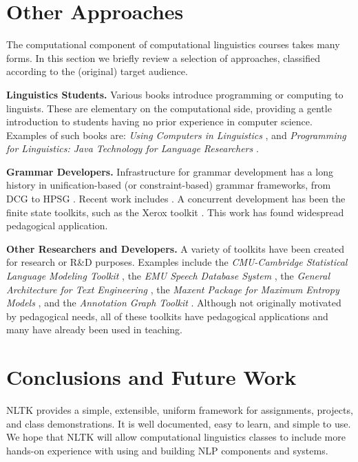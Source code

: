 \documentclass[11pt]{article}
\begin{document}
\section{Other Approaches}
\label{sec:approaches}

The computational component of computational linguistics courses takes
many forms.  In this section we briefly review a selection of approaches,
classified according to the (original) target audience.

{\bf Linguistics Students.}
Various books introduce programming or computing to linguists.
These are elementary on the computational side, providing a
gentle introduction to students having no prior experience
in computer science.  Examples of such books are:
\emph{Using Computers in Linguistics}
\cite{Lawler98}, and
\emph{Programming for Linguistics: Java Technology for Language
Researchers} \cite{Hammond02}.

{\bf Grammar Developers.}
Infrastructure for grammar development has a long history in
unification-based (or constraint-based) grammar frameworks, from DCG
\cite{PereiraWarren80} to HPSG \cite{PollardSag94}.  Recent work includes
\cite{Copestake00,Baldridge02}.  A concurrent development has been the
finite state toolkits, such as the Xerox toolkit \cite{Beesley02}.  This
work has found widespread pedagogical application.

{\bf Other Researchers and Developers.}
A variety of toolkits have been created for research or R\&D
purposes.  Examples include
the \emph{CMU-Cambridge Statistical Language Modeling Toolkit}
\cite{Clarkson97},
the \emph{EMU Speech Database System} \cite{Harrington99},
the \emph{General Architecture for Text Engineering} \cite{Bontcheva02},
the \emph{Maxent Package for Maximum Entropy Models} \cite{maxent},
and the \emph{Annotation Graph Toolkit} \cite{MaedaBird02}.
Although not originally motivated by pedagogical needs, all of these
toolkits have pedagogical applications and many have already been
used in teaching.

\section{Conclusions and Future Work}
\label{sec:conclusion}

NLTK provides a simple, extensible, uniform framework for assignments,
projects, and class demonstrations.  It is well documented, easy to
learn, and simple to use.  We hope that NLTK will allow computational
linguistics classes to include more hands-on experience with using and
building NLP components and systems.
\end{document}
